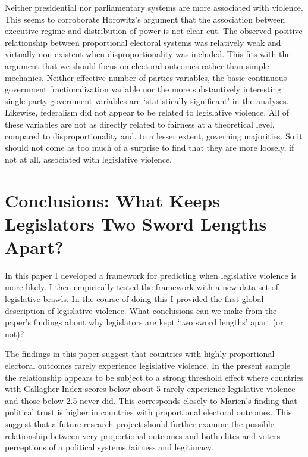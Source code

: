\documentclass[a4paper]{article}\usepackage{graphicx, color}
\begin{document}
Neither presidential nor parliamentary systems are more associated with violence. This seems to corroborate Horowitz's \citeyearpar{Horowitz1990} argument that the association between executive regime and distribution of power is not clear cut. The observed positive relationship between proportional electoral systems was relatively weak and virtually non-existent when disproportionality was included. This fits with the argument that we should focus on electoral outcomes rather than simple mechanics. Neither effective number of parties variables, the basic continuous government fractionalization variable nor the more substantively interesting single-party government variables are `statistically significant' in the analyses. Likewise, federalism did not appear to be related to legislative violence. All of these variables are not as directly related to fairness at a theoretical level, compared to disproportionality and, to a lesser extent, governing majorities. So it should not come as too much of a surprise to find that they are more loosely, if not at all, associated with legislative violence.

\section*{Conclusions: What Keeps Legislators Two Sword Lengths Apart?}

In this paper I developed a framework for predicting when legislative violence is more likely. I then empirically tested the framework with a new data set of legislative brawls. In the course of doing this I provided the first global description of legislative violence. What conclusions can we make from the paper's findings about why legislators are kept `two sword lengths' apart (or not)?

The findings in this paper suggest that countries with highly proportional electoral outcomes rarely experience legislative violence. In the present sample the relationship appears to be subject to a strong threshold effect where countries with Gallagher Index scores below about 5 rarely experience legislative violence and those below 2.5 never did. This corresponds closely to Marien's \cite{Marien2011} finding that political trust is higher in countries with proportional electoral outcomes. This suggest that a future research project should further examine the possible relationship between very proportional outcomes and both elites and voters perceptions of a political systems fairness and legitimacy.
\end{document}
